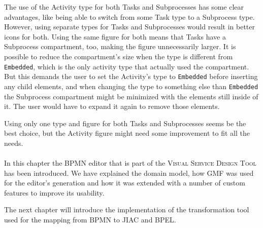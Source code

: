 The use of the Activity type for both Tasks and Subprocesses has some clear advantages, like being able to switch from some Task type to a Subprocess type. However, using separate types for Tasks and Subprocesses would result in better icons for both. Using the same figure for both means that Tasks have a Subprocess compartment, too, making the figure unnecessarily larger. It is possible to reduce the compartment's size when the type is different from \verb|Embedded|, which is the only activity type that actually used the compartment. But this demands the user to set the Activity's type to \verb|Embedded| before inserting any child elements, and when changing the type to something else than \verb|Embedded| the Subprocess compartment might be minimized with the elements still inside of it. The user would have to expand it again to remove those elements.

Using only one type and figure for both Tasks and Subprocesses seems be the best choice, but the Activity figure might need some improvement to fit all the needs.
\\
\\

In this chapter the BPMN editor that is part of the \textsc{Visual Service Design Tool} has been introduced. We have explained the domain model, how GMF was used for the editor's generation and how it was extended with a number of custom features to improve its usability.

The next chapter will introduce the implementation of the transformation tool used for the mapping from BPMN to JIAC and BPEL.